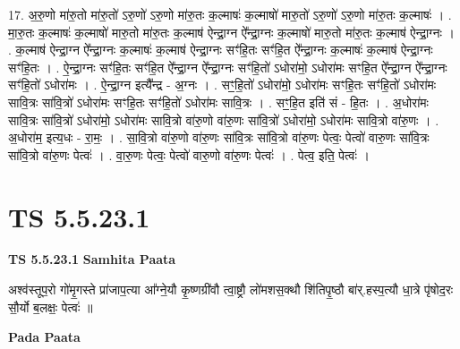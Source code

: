 \documentclass[17pt]{extarticle}
\begin{document}
17. अ॒रु॒णो मा॑रु॒तो मा॑रु॒तो॑ ऽरु॒णो॑ ऽरु॒णो मा॑रु॒तः क॒ल्माषः॑ क॒ल्माषो॑ मारु॒तो॑ ऽरु॒णो॑ ऽरु॒णो मा॑रु॒तः क॒ल्माषः॑ । . मा॒रु॒तः क॒ल्माषः॑ क॒ल्माषो॑ मारु॒तो मा॑रु॒तः क॒ल्माष॑ ऐन्द्रा॒ग्न ऐ᳚न्द्रा॒ग्नः क॒ल्माषो॑ मारु॒तो मा॑रु॒तः क॒ल्माष॑ ऐन्द्रा॒ग्नः । . क॒ल्माष॑ ऐन्द्रा॒ग्न ऐ᳚न्द्रा॒ग्नः क॒ल्माषः॑ क॒ल्माष॑ ऐन्द्रा॒ग्नः सꣳ॑हि॒तः सꣳ॑हि॒त ऐ᳚न्द्रा॒ग्नः क॒ल्माषः॑ क॒ल्माष॑ ऐन्द्रा॒ग्नः सꣳ॑हि॒तः । . ऐ॒न्द्रा॒ग्नः सꣳ॑हि॒तः सꣳ॑हि॒त ऐ᳚न्द्रा॒ग्न ऐ᳚न्द्रा॒ग्नः सꣳ॑हि॒तो॑ ऽधोरा॑मो॒ ऽधोरा॑मः सꣳहि॒त ऐ᳚न्द्रा॒ग्न ऐ᳚न्द्रा॒ग्नः सꣳ॑हि॒तो॑ ऽधोरा॑मः । . ऐ॒न्द्रा॒ग्न इत्यै᳚न्द्र - अ॒ग्नः । . सꣳ॒॒हि॒तो॑ ऽधोरा॑मो॒ ऽधोरा॑मः सꣳहि॒तः सꣳ॑हि॒तो॑ ऽधोरा॑मः सावि॒त्रः सा॑वि॒त्रो॑ ऽधोरा॑मः सꣳहि॒तः सꣳ॑हि॒तो॑ ऽधोरा॑मः सावि॒त्रः । . सꣳ॒॒हि॒त इति॑ सं - हि॒तः । . अ॒धोरा॑मः सावि॒त्रः सा॑वि॒त्रो॑ ऽधोरा॑मो॒ ऽधोरा॑मः सावि॒त्रो वा॑रु॒णो वा॑रु॒णः सा॑वि॒त्रो॑ ऽधोरा॑मो॒ ऽधोरा॑मः सावि॒त्रो वा॑रु॒णः । . अ॒धोरा॑म॒ इत्य॒धः - रा॒मः॒ । . सा॒वि॒त्रो वा॑रु॒णो वा॑रु॒णः सा॑वि॒त्रः सा॑वि॒त्रो वा॑रु॒णः पेत्वः॒ पेत्वो॑ वारु॒णः सा॑वि॒त्रः सा॑वि॒त्रो वा॑रु॒णः पेत्वः॑ । . वा॒रु॒णः पेत्वः॒ पेत्वो॑ वारु॒णो वा॑रु॒णः पेत्वः॑ । . पेत्व॒ इति॒ पेत्वः॑ । \newline
\pagebreak
{}

\section{ TS 5.5.23.1 }

\textbf{TS 5.5.23.1 } \newline
\textbf{Samhita Paata} \newline

अश्व॑स्तूप॒रो गो॑मृ॒गस्ते प्रा॑जाप॒त्या आ᳚ग्ने॒यौ कृ॒ष्णग्री॑वौ त्वा॒ष्ट्रौ लो॑मशस॒क्थौ शि॑तिपृ॒ष्ठौ बा॑र्.हस्प॒त्यौ धा॒त्रे पृ॑षोद॒रः सौ॒र्यो ब॒लक्षः॒ पेत्वः॑ ॥ \newline

\textbf{Pada Paata} \newline
\end{document}
